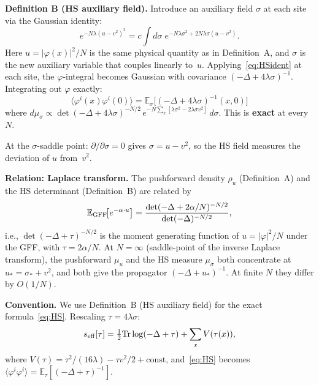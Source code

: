\documentclass[12pt]{article}
\theoremstyle{definition}
\theoremstyle{remark}
\newcommand{\E}{\mathbb{E}}
\newcommand{\Tr}{\mathrm{Tr}}
\newcommand{\ph}{\varphi}
\begin{document}
\medskip\noindent
\textbf{Definition B (HS auxiliary field).}
Introduce an auxiliary field $\sigma$ at each site via the Gaussian
identity:
\begin{equation}
\label{eq:HSident}
  e^{-N\lambda(u-v^2)^2}
    = c\!\int\! d\sigma\; e^{-N\lambda\sigma^2+2N\lambda\sigma(u-v^2)}.
\end{equation}
Here $u = |\ph(x)|^2/N$ is the same physical quantity as in
Definition~A, and $\sigma$ is the new auxiliary variable that
couples linearly to~$u$. Applying~\eqref{eq:HSident} at each site,
the $\ph$-integral becomes Gaussian with covariance
$(-\Delta+4\lambda\sigma)^{-1}$. Integrating out $\ph$ exactly:
\begin{equation}
\label{eq:HS}
  \langle\ph^i(x)\ph^i(0)\rangle
    = \E_\sigma\!\bigl[(-\Delta+4\lambda\sigma)^{-1}(x,0)\bigr]
\end{equation}
where
$d\mu_\sigma \propto \det(-\Delta+4\lambda\sigma)^{-N/2}\,
e^{-N\sum_x[\lambda\sigma^2-2\lambda\sigma v^2]}\,d\sigma$.
This is \textbf{exact} at every~$N$.

At the $\sigma$-saddle point:
$\partial/\partial\sigma = 0$ gives $\sigma = u - v^2$,
so the HS field measures the deviation of $u$ from~$v^2$.

\medskip\noindent
\textbf{Relation: Laplace transform.}
The pushforward density $\rho_u$ (Definition~A) and the HS
determinant (Definition~B) are related by
\begin{equation}
\label{eq:laplace}
  \E_{\rm GFF}\!\bigl[e^{-\alpha\cdot u}\bigr]
    = \frac{\det(-\Delta+2\alpha/N)^{-N/2}}{\det(-\Delta)^{-N/2}},
\end{equation}
i.e., $\det(-\Delta+\tau)^{-N/2}$ is the moment generating function
of $u = |\ph|^2/N$ under the GFF, with $\tau = 2\alpha/N$.
At $N=\infty$ (saddle-point of the inverse Laplace transform),
the pushforward $\mu_u$ and the HS measure $\mu_\sigma$ both
concentrate at $u_* = \sigma_* + v^2$, and both give the propagator
$(-\Delta+u_*)^{-1}$. At finite $N$ they differ by $O(1/N)$.

\medskip\noindent
\textbf{Convention.} We use Definition~B (HS auxiliary field) for
the exact formula~\eqref{eq:HS}. Rescaling $\tau = 4\lambda\sigma$:
\begin{equation}
\label{eq:seff}
  s_{\rm eff}[\tau]
    = \tfrac{1}{2}\Tr\log(-\Delta+\tau) + \sum_x V(\tau(x)),
\end{equation}
where $V(\tau) = \tau^2/(16\lambda) - \tau v^2/2 + \mathrm{const}$,
and~\eqref{eq:HS} becomes
$\langle\ph^i\ph^i\rangle = \E_\tau[(-\Delta+\tau)^{-1}]$.
\end{document}
